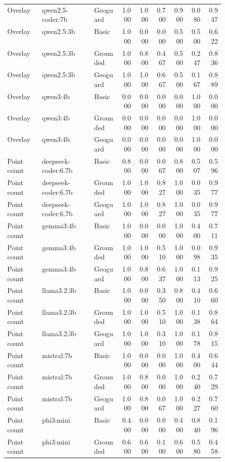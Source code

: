 \begin{longtable}{p{0.16\linewidth}p{0.24\linewidth}p{0.12\linewidth}rrrrrr}
Overlay & qwen2.5-coder:7b & Geoguard & 1.000 & 1.000 & 0.700 & 0.900 & 0.080 & 0.947 \\
Overlay & qwen2.5:3b & Basic & 1.000 & 0.000 & 0.000 & 0.500 & 0.500 & 0.622 \\
Overlay & qwen2.5:3b & Grounded & 1.000 & 0.800 & 0.467 & 0.500 & 0.247 & 0.836 \\
Overlay & qwen2.5:3b & Geoguard & 1.000 & 1.000 & 0.667 & 0.500 & 0.167 & 0.889 \\
Overlay & qwen3:4b & Basic & 0.000 & 0.000 & 0.000 & 0.000 & 1.000 & 0.000 \\
Overlay & qwen3:4b & Grounded & 0.000 & 0.000 & 0.000 & 0.000 & 1.000 & 0.000 \\
Overlay & qwen3:4b & Geoguard & 0.000 & 0.000 & 0.000 & 0.000 & 1.000 & 0.000 \\
Point count & deepseek-coder:6.7b & Basic & 0.800 & 0.000 & 0.067 & 0.800 & 0.507 & 0.596 \\
Point count & deepseek-coder:6.7b & Grounded & 1.000 & 1.000 & 0.827 & 1.000 & 0.035 & 0.977 \\
Point count & deepseek-coder:6.7b & Geoguard & 1.000 & 1.000 & 0.827 & 1.000 & 0.035 & 0.977 \\
Point count & gemma3:4b & Basic & 1.000 & 0.000 & 0.000 & 1.000 & 0.400 & 0.711 \\
Point count & gemma3:4b & Grounded & 1.000 & 1.000 & 0.510 & 1.000 & 0.098 & 0.935 \\
Point count & gemma3:4b & Geoguard & 1.000 & 0.800 & 0.637 & 1.000 & 0.113 & 0.925 \\
Point count & llama3.2:3b & Basic & 1.000 & 0.000 & 0.350 & 0.800 & 0.410 & 0.660 \\
Point count & llama3.2:3b & Grounded & 1.000 & 1.000 & 0.510 & 1.000 & 0.138 & 0.864 \\
Point count & llama3.2:3b & Geoguard & 1.000 & 1.000 & 0.310 & 1.000 & 0.178 & 0.815 \\
Point count & mistral:7b & Basic & 1.000 & 0.000 & 0.000 & 1.000 & 0.400 & 0.644 \\
Point count & mistral:7b & Grounded & 1.000 & 0.800 & 0.000 & 1.000 & 0.240 & 0.729 \\
Point count & mistral:7b & Geoguard & 1.000 & 0.800 & 0.067 & 1.000 & 0.227 & 0.760 \\
Point count & phi3:mini & Basic & 0.400 & 0.000 & 0.000 & 0.400 & 0.840 & 0.196 \\
Point count & phi3:mini & Grounded & 0.600 & 0.600 & 0.100 & 0.600 & 0.580 & 0.458 \\

\end{longtable}
